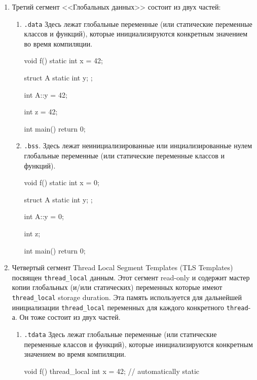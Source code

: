 \documentclass{article}
\begin{document}
\begin{enumerate}
\begin{enumerate}
\item Таблицы виртуальных функций.
Например класс
\begin{cppcode}[numbers = none]
struct A {
  virtual f() const {}
};
\end{cppcode}
хранит внутри себя указатель на таблицу виртуальных функций.
В данном случае таблица содержит указатель на метод \verb"A::f".
Данная таблица располагается в \verb".rodata" сегменте памяти.

\item Данные для поддержки RTTI.
Для обеспечения работы механизмов вроде \verb"dynamic_cast" и \verb"typeid".

\item Константы используемые в ассемблерных вставках.
Даже не хочу это комментировать.
\end{enumerate}

\item Третий сегмент <<Глобальных данных>> состоит из двух частей:
\begin{enumerate}
\item \verb".data"
Здесь лежат глобальные переменные (или статические переменные классов и функций), которые инициализируются конкретным значением во время компиляции.
\begin{cppcode}[numbers = none]
void f() {
  static int x = 42;
}

struct A {
  static int y;
};

int A::y = 42;

int z = 42;

int main() {
  return 0;
}
\end{cppcode}

\item \verb".bss".
Здесь лежат неинициализированные или инциализированные нулем глобальные переменные (или статические переменные классов и функций).
\begin{cppcode}[numbers = none]
void f() {
  static int x = 0;
}

struct A {
  static int y;
};

int A::y = 0;

int z;

int main() {
  return 0;
}
\end{cppcode}
\end{enumerate}

\item Четвертый сегмент Thread Local Segment Templates (TLS Templates) посвящен \verb"thread_local" данным.
Этот сегмент read-only и содержит мастер копии глобальных (и/или статических) переменных которые имеют \verb"thread_local" storage duration.
Эта память используется для дальнейшей инициализации \verb"thread_local" переменных для каждого конкретного \verb"thread"-а.
Он тоже состоит из двух частей.
\begin{enumerate}
\item \verb".tdata"
Здесь лежат глобальные переменные (или статические переменные классов и функций), которые инициализируются конкретным значением во время компиляции.
\begin{cppcode}[numbers = none]
void f() {
  thread_local int x = 42; // automatically static
}


\end{cppcode}
\end{enumerate}
\end{enumerate}
\end{document}
